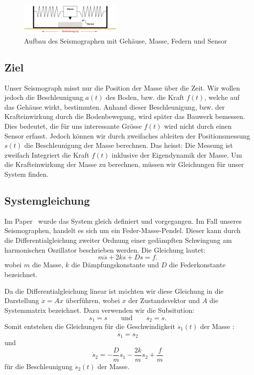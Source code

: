 \begin{figure}
 \begin{center}
 \includegraphics[width=5cm]{papers/erdbeben/Apperatur}
 \caption{Aufbau des Seismographen mit Gehäuse, Masse, Federn und Sensor}
 \label{erdbeben:Seismograph}
 \end{center}
\end{figure}

\subsection{Ziel}
Unser Seismograph misst nur die Position der Masse über die Zeit. 
Wir wollen jedoch die Beschleunigung $a(t)$ des Boden, bzw. die Kraft $f(t)$, welche auf das Gehäuse wirkt, bestimmten.  
Anhand dieser Beschleunigung, bzw. der Krafteinwirkung durch die Bodenbewegung, wird später das Bauwerk bemessen.
Dies bedeutet, die für uns interessante Grösse $f(t)$ wird nicht durch einen Sensor erfasst. 
Jedoch können wir durch zweifaches ableiten der Positionsmessung $s(t)$ die Beschleunigung der Masse berechnen. 
Das heisst: Die Messung ist zweifach Integriert die Kraft $f(t)$ inklusive der Eigendynamik der Masse.
Um die Krafteinwirkung der Masse zu berechnen, müssen wir Gleichungen für unser System finden.

\subsection{Systemgleichung}
Im Paper~\cite{erdbeben:mendezmueller} wurde das System gleich definiert und vorgegangen. 
Im Fall unseres Seismographen, handelt es sich um ein Feder-Masse-Pendel.
Dieser kann durch die Differentialgleichung zweiter Ordnung einer gedämpften Schwingung am harmonischen Oszillator beschrieben werden. 
Die Gleichung lautet:
\begin{equation}
	\label{erdbeben:Systemgleichung}
m\ddot s + 2k \dot s + Ds = f.
\end{equation}
wobei $m$ die Masse, $k$ die Dämpfungskonstante und $D$ die Federkonstante bezeichnet.


Da die Differentialgleichung linear ist möchten wir diese Gleichung in die Darstellung $\dot x = Ax$ überführen, wobei $x$ der Zustandsvektor und $A$ die Systemmatrix bezeichnet. Dazu verwenden wir die Subsitution:
\[ 
s_1 = s 
\qquad \text{und} \qquad
s_2 = \dot s.
\]
Somit entstehen die Gleichungen für die Geschwindigkeit $ \dot s_1(t)$ der Masse :
\[ \dot {s_1} = {s_2}\] 
und
\[ \dot s_2 = -\frac{D}{m} {s_1} -\frac{2k}{m} {s_2} + \frac{f} {m} \] 
für die Beschleunigung $\dot s_2(t)$ der Masse.

